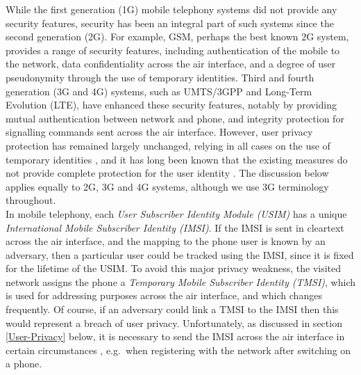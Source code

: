\documentclass{acm_proc_article-sp}
\begin{document}
While the first generation (1G) mobile telephony systems did not provide any security features, security has been an integral part of such systems since the second generation (2G).  For example, GSM, perhaps the best known 2G system, provides a range of security features, including authentication of the mobile to the network, data confidentiality across the air interface, and a degree of user pseudonymity through the use of temporary identities. Third and fourth generation (3G and 4G) systems, such as UMTS/3GPP and Long-Term Evolution (LTE), have enhanced these security features, notably by providing mutual authentication between network and phone, and integrity protection for signalling commands sent across the air interface.  However, user privacy protection has remained largely unchanged, relying in all cases on the use of temporary identities \cite{LTE-Security_Niemi-2012,UMTS-Security_Niemi_2003}, and it has long been known that the existing measures do not provide complete protection for the user identity \cite{ETSI_TS_121_133:2001,ETSI_TS_133_102:2013}. The discussion below applies equally to 2G, 3G and 4G systems, although we use 3G terminology throughout.  \\

In mobile telephony, each \emph{User Subscriber Identity Module (USIM)} has a unique \emph{International Mobile Subscriber Identity (IMSI)}\@. If the IMSI is sent in cleartext across the air interface, and the mapping to the phone user is known by an adversary, then a particular user could be tracked using the IMSI, since it is fixed for the lifetime of the USIM. To avoid this major privacy weakness, the visited network assigns the phone a \emph{Temporary Mobile Subscriber Identity (TMSI)}, which is used for addressing purposes across the air interface, and which changes frequently.  Of course, if an adversary could link a TMSI to the IMSI then this would represent a breach of user privacy. Unfortunately, as discussed in section \ref{User-Privacy} below, it is necessary to send the IMSI across the air interface in certain circumstances \cite{Privacy-in-Communication_Koien_2013}, e.g.\ when registering with the network after switching on a phone.  \\
\end{document}
